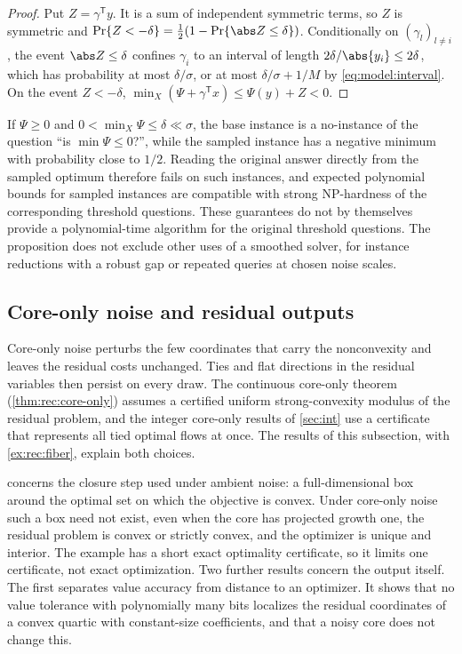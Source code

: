 \begin{proof}
Put $Z=\gamma^{\mathsf T}y$. It is a sum of independent symmetric terms, so
$Z$ is symmetric and $\Pr\{Z<-\delta\}=\frac12(1-\Pr\{\abs Z\le\delta\})$.
Conditionally on $(\gamma_l)_{l\ne i}$, the event $\abs Z\le\delta$ confines
$\gamma_i$ to an interval of length $2\delta/\abs{y_i}\le2\delta$, which has
probability at most $\delta/\sigma$, or at most $\delta/\sigma+1/M$ by
\eqref{eq:model:interval}. On the event $Z<-\delta$,
$\min_X(\Psi+\gamma^{\mathsf T}x)\le\Psi(y)+Z<0$.
\end{proof}

If $\Psi\ge0$ and $0<\min_X\Psi\le\delta\ll\sigma$, the base instance is a
no-instance of the question ``is $\min\Psi\le0$?'', while the sampled
instance has a negative minimum with probability close to $1/2$. Reading
the original answer directly from the sampled optimum therefore fails on
such instances, and expected polynomial bounds for sampled instances are
compatible with strong NP-hardness of the corresponding threshold
questions. These guarantees do not by themselves provide a polynomial-time
algorithm for the original threshold questions. The proposition does not
exclude other uses of a smoothed solver, for instance reductions with a
robust gap or repeated queries at chosen noise scales.

\subsection{Core-only noise and residual outputs}\label{sec:lim:points}

Core-only noise perturbs the few coordinates that carry the nonconvexity
and leaves the residual costs unchanged. Ties and flat directions in the
residual variables then persist on every draw. The continuous core-only
theorem (\cref{thm:rec:core-only}) assumes a certified uniform
strong-convexity modulus of the residual problem, and the integer core-only
results of \cref{sec:int} use a certificate that represents all tied
optimal flows at once. The results of this subsection, with
\cref{ex:rec:fiber}, explain both choices.

 concerns the closure step used under ambient noise: a
full-dimensional box around the optimal set on which the objective is
convex. Under core-only noise such a box need not exist, even when the core
has projected growth one, the residual problem is convex or strictly convex,
and the optimizer is unique and interior. The example has a short exact
optimality certificate, so it limits one certificate, not exact
optimization. Two further results concern the output itself. The first
separates value accuracy from distance to an optimizer. It shows that no
value tolerance with polynomially many bits localizes the residual
coordinates of a convex quartic with constant-size coefficients, and that a
noisy core does not change this.

